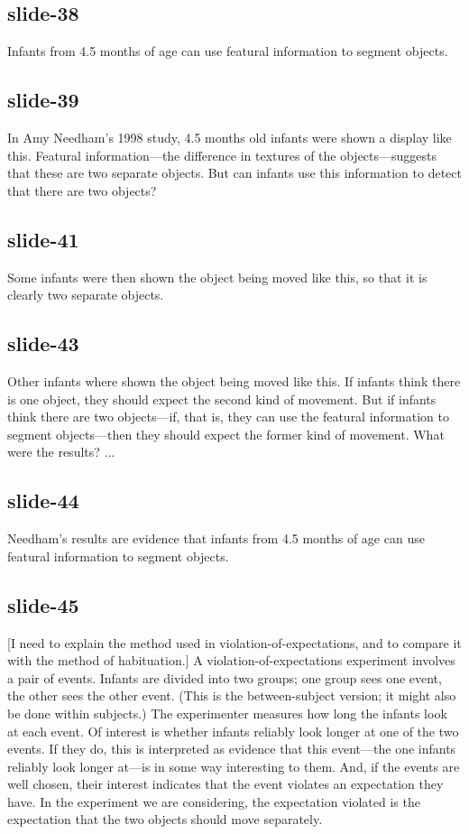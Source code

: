 \documentclass[12pt,\papersize]{extarticle}
\begin{document}
\subsection{slide-38}
Infants from 4.5 months of age can use featural information to segment objects.
 
\subsection{slide-39}
In Amy Needham's 1998 study, 4.5 months old infants were shown a display like this.
Featural information---the difference in textures of the objects---suggests that these are two 
separate objects.  But can infants use this information to detect that there are two objects?
 
\subsection{slide-41}
Some infants were then shown the object being moved like this, so that it is clearly two 
separate objects.
 
\subsection{slide-43}
Other infants where shown the object being moved like this.
If infants think there is one object, they should expect the second kind of movement.
But if infants think there are two objects---if, that is, they can use the featural 
information to segment objects---then they should expect the former kind of movement.
What were the results?  ...
 
\subsection{slide-44}
Needham's results are evidence that infants from 4.5 months of age can use featural information 
to segment objects.
 
\subsection{slide-45}
[I need to explain the method used in violation-of-expectations, and to compare it with
the method of habituation.]
A violation-of-expectations experiment involves a pair of events.
Infants are divided into two groups; one group sees one event, the other sees the other event.
(This is the between-subject version; it might also be done within subjects.)
The experimenter measures how long the infants look at each event.
Of interest is whether infants reliably look longer at one of the two events.
If they do, this is interpreted as evidence that this event---the one infants reliably look 
longer at---is in some way interesting to them. 
And, if the events are well chosen, their interest indicates that the event violates an
expectation they have.
In the experiment we are considering, the expectation violated is the expectation that 
the two objects should move separately.
 
\end{document}

